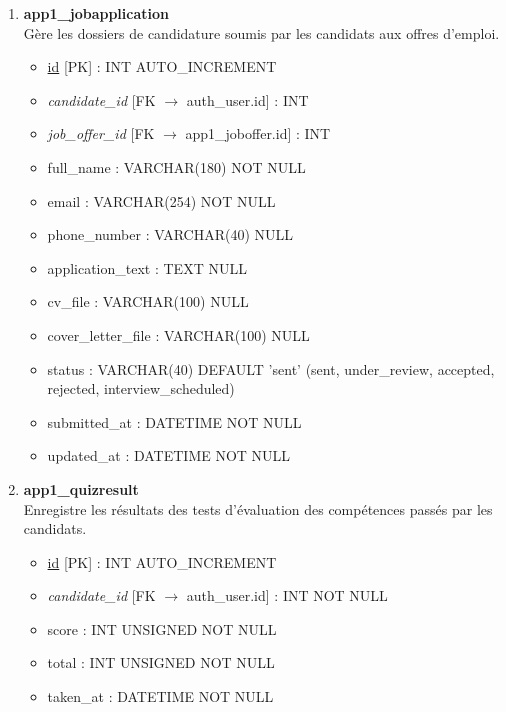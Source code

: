 \begin{enumerate}
    \item \textbf{app1\_jobapplication} \\
    Gère les dossiers de candidature soumis par les candidats aux offres d'emploi.
    \begin{itemize}
        \item \underline{id} [PK] : INT AUTO\_INCREMENT
        \item \textit{candidate\_id} [FK $\rightarrow$ auth\_user.id] : INT
        \item \textit{job\_offer\_id} [FK $\rightarrow$ app1\_joboffer.id] : INT
        \item full\_name : VARCHAR(180) NOT NULL
        \item email : VARCHAR(254) NOT NULL
        \item phone\_number : VARCHAR(40) NULL
        \item application\_text : TEXT NULL
        \item cv\_file : VARCHAR(100) NULL
        \item cover\_letter\_file : VARCHAR(100) NULL
        \item status : VARCHAR(40) DEFAULT 'sent' (sent, under\_review, accepted, rejected, interview\_scheduled)
        \item submitted\_at : DATETIME NOT NULL
        \item updated\_at : DATETIME NOT NULL
    \end{itemize}

    \item \textbf{app1\_quizresult} \\
    Enregistre les résultats des tests d'évaluation des compétences passés par les candidats.
    \begin{itemize}
        \item \underline{id} [PK] : INT AUTO\_INCREMENT
        \item \textit{candidate\_id} [FK $\rightarrow$ auth\_user.id] : INT NOT NULL
        \item score : INT UNSIGNED NOT NULL
        \item total : INT UNSIGNED NOT NULL
        \item taken\_at : DATETIME NOT NULL
    \end{itemize}


\end{enumerate}
